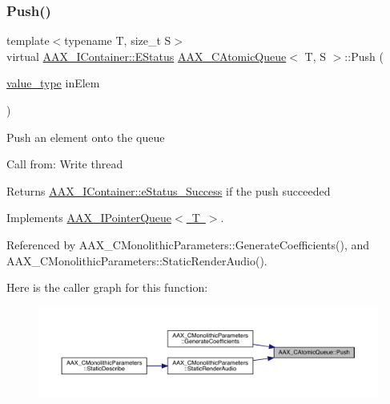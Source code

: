 \mbox{\label{a01441_a2304d6ba1f1026b6a42de48056ab3050}} 
\subsubsection{\texorpdfstring{Push()}{Push()}}
{\footnotesize\ttfamily template$<$typename T, size\+\_\+t S$>$ \\
virtual \mbox{\hyperlink{a01785_aea020100f0b06636ce7cb25c2fdb0af7}{A\+A\+X\+\_\+\+I\+Container\+::\+E\+Status}} \mbox{\hyperlink{a01441}{A\+A\+X\+\_\+\+C\+Atomic\+Queue}}$<$ T, S $>$\+::Push (\begin{DoxyParamCaption}\item[{\mbox{\hyperlink{a01441_acbb95bad3be34c7e4c770bc8c455c252}{value\+\_\+type}}}]{in\+Elem }\end{DoxyParamCaption})\hspace{0.3cm}{\ttfamily [virtual]}}





Push an element onto the queue

Call from\+: Write thread

\begin{DoxyReturn}{Returns}
\mbox{\hyperlink{a01785_aea020100f0b06636ce7cb25c2fdb0af7add595169a28f04ed79be4f1c5974eb48}{A\+A\+X\+\_\+\+I\+Container\+::e\+Status\+\_\+\+Success}} if the push succeeded 
\end{DoxyReturn}


Implements \mbox{\hyperlink{a01861_a6f8185d83cac520021bbca7054c57d38}{A\+A\+X\+\_\+\+I\+Pointer\+Queue$<$ T $>$}}.



Referenced by A\+A\+X\+\_\+\+C\+Monolithic\+Parameters\+::\+Generate\+Coefficients(), and A\+A\+X\+\_\+\+C\+Monolithic\+Parameters\+::\+Static\+Render\+Audio().

Here is the caller graph for this function\+:
\nopagebreak
\begin{figure}[H]
\begin{center}
\leavevmode
\includegraphics[width=350pt]{a01441_a2304d6ba1f1026b6a42de48056ab3050_icgraph}
\end{center}
\end{figure}
\mbox{\label{a01441_a0c64180813c16b4952761f82e32d7edd}} 
